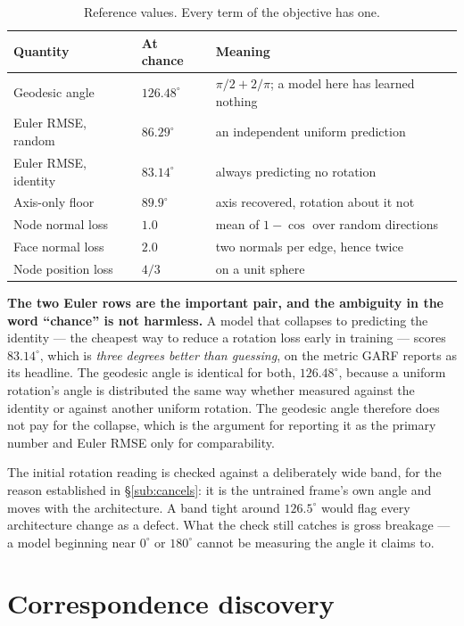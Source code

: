 \documentclass[11pt,a4paper]{report}
\begin{document}
\begin{table}[h]
\centering
\small
\begin{tabular}{llp{7.2cm}}
\toprule
\textbf{Quantity} & \textbf{At chance} & \textbf{Meaning} \\
\midrule
Geodesic angle & $126.48^{\circ}$ & $\pi/2 + 2/\pi$; a model here has learned nothing \\
Euler RMSE, random & $86.29^{\circ}$ & an independent uniform prediction \\
Euler RMSE, identity & $83.14^{\circ}$ & always predicting no rotation \\
Axis-only floor & $89.9^{\circ}$ & axis recovered, rotation about it not \\
Node normal loss & $1.0$ & mean of $1 - \cos$ over random directions \\
Face normal loss & $2.0$ & two normals per edge, hence twice \\
Node position loss & $4/3$ & on a unit sphere \\
\bottomrule
\end{tabular}
\caption{Reference values. Every term of the objective has one.}
\end{table}

\textbf{The two Euler rows are the important pair, and the ambiguity in the word
``chance'' is not harmless.} A model that collapses to predicting the identity
--- the cheapest way to reduce a rotation loss early in training --- scores
$83.14^{\circ}$, which is \emph{three degrees better than guessing}, on the
metric GARF reports as its headline. The geodesic angle is identical for both,
$126.48^{\circ}$, because a uniform rotation's angle is distributed the same way
whether measured against the identity or against another uniform rotation. The
geodesic angle therefore does not pay for the collapse, which is the argument
for reporting it as the primary number and Euler RMSE only for comparability.

The initial rotation reading is checked against a deliberately wide band, for
the reason established in \S\ref{sub:cancels}: it is the untrained frame's own angle and
moves with the architecture. A band tight around $126.5^{\circ}$ would flag
every architecture change as a defect. What the check still catches is gross
breakage --- a model beginning near $0^{\circ}$ or $180^{\circ}$ cannot be
measuring the angle it claims to.

\section{Correspondence discovery}
\label{sec:correspondence}
\end{document}
